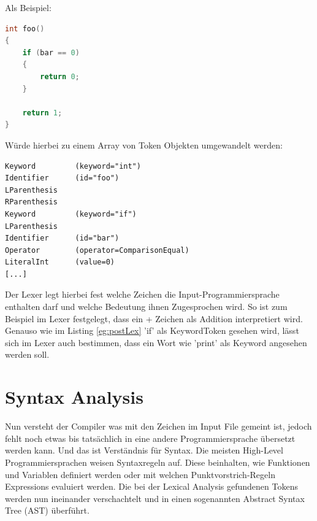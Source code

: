 Als Beispiel:

\begin{lstlisting}[language=C, label=eg:preLex, caption=C code vor Lexical Analysis]
int foo()
{
    if (bar == 0)
    {
        return 0;
    }

    return 1;
}
\end{lstlisting}

Würde hierbei zu einem Array von Token Objekten umgewandelt werden:

\begin{lstlisting}[label=eg:postLex, caption=Tokens nach Lexical Analysis]
Keyword         (keyword="int")
Identifier      (id="foo")
LParenthesis
RParenthesis
Keyword         (keyword="if")
LParenthesis
Identifier      (id="bar")
Operator        (operator=ComparisonEqual)
LiteralInt      (value=0)
[...]
\end{lstlisting}

Der Lexer legt hierbei fest welche Zeichen die Input-Programmiersprache enthalten darf und welche Bedeutung ihnen Zugesprochen wird. So ist zum Beispiel im Lexer festgelegt, dass ein + Zeichen als Addition interpretiert wird.
Genauso wie im Listing \ref{eg:postLex} 'if' als KeywordToken gesehen wird, lässt sich im Lexer auch bestimmen, dass ein Wort wie 'print' als Keyword angesehen werden soll.

\section{Syntax Analysis}
Nun versteht der Compiler was mit den Zeichen im Input File gemeint ist, jedoch fehlt noch etwas bis tatsächlich in eine andere Programmiersprache übersetzt werden kann. Und das ist Verständnis für Syntax.
Die meisten High-Level Programmiersprachen weisen Syntaxregeln auf. Diese beinhalten, wie Funktionen und Variablen definiert werden oder mit welchen Punktvorstrich-Regeln Expressions evaluiert werden.
Die bei der Lexical Analysis gefundenen Tokens werden nun ineinander verschachtelt und in einen sogenannten Abstract Syntax Tree (AST) überführt.

